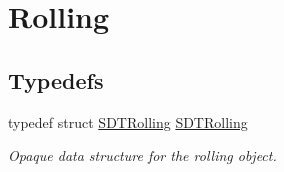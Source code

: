 \hypertarget{group__rolling}{}\section{Rolling}
\label{group__rolling}
\subsection*{Typedefs}
\begin{DoxyCompactItemize}
\item 
\hypertarget{group__rolling_ga0a20b598aea5fdc9789aa77fdb4852b1}{}typedef struct \hyperlink{group__rolling_ga0a20b598aea5fdc9789aa77fdb4852b1}{S\+D\+T\+Rolling} \hyperlink{group__rolling_ga0a20b598aea5fdc9789aa77fdb4852b1}{S\+D\+T\+Rolling}\label{group__rolling_ga0a20b598aea5fdc9789aa77fdb4852b1}

\begin{DoxyCompactList}\small\item\em Opaque data structure for the rolling object. \end{DoxyCompactList}\end{DoxyCompactItemize}
